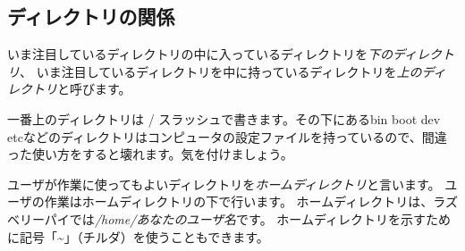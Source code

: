 \begin{tcolorbox}[title=\useOmetoi]
\begin{enumerate}
\end{enumerate}
\end{tcolorbox}

\subsection{ディレクトリの関係}
いま注目しているディレクトリの中に入っているディレクトリを\emph{下のディレクトリ}、
いま注目しているディレクトリを中に持っているディレクトリを\emph{上のディレクトリ}と呼びます。

一番上のディレクトリは / スラッシュで書きます。その下にあるbin boot dev etcなどのディレクトリはコンピュータの設定ファイルを持っているので、間違った使い方をすると壊れます。気を付けましょう。

ユーザが作業に使ってもよいディレクトリを\emph{ホームディレクトリ}と言います。
ユーザの作業はホームディレクトリの下で行います。
ホームディレクトリは、ラズベリーパイでは\emph{/home/あなたのユーザ名}です。
ホームディレクトリを示すために記号「\textasciitilde」（チルダ）を使うこともできます。

